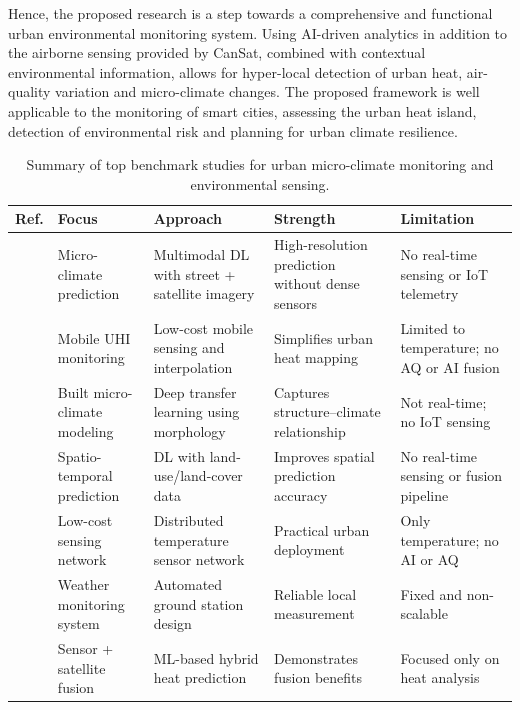 \documentclass[conference]{IEEEtran}
\begin{document}
Hence, the proposed research is a step towards a comprehensive and functional urban environmental monitoring system. Using AI-driven analytics in addition to the airborne sensing provided by CanSat, combined with contextual environmental information, allows for hyper-local detection of urban heat, air-quality variation and micro-climate changes. The proposed framework is well applicable to the monitoring of smart cities, assessing the urban heat island, detection of environmental risk and planning for urban climate resilience.

\begin{table}[!t]
\centering
\caption{Summary of top benchmark studies for urban micro-climate monitoring and environmental sensing.}
\label{tab:lit_short}
\renewcommand{\arraystretch}{1.15}
\setlength{\tabcolsep}{4pt}

\begin{tabularx}{\textwidth}{|c|p{3cm}|p{3.2cm}|p{3.5cm}|X|}
\hline
\textbf{Ref.} & \textbf{Focus} & \textbf{Approach} & \textbf{Strength} & \textbf{Limitation} \\
\hline

\cite{R1} & Micro-climate prediction & Multimodal DL with street + satellite imagery & High-resolution prediction without dense sensors & No real-time sensing or IoT telemetry \\

\cite{R3} & Mobile UHI monitoring & Low-cost mobile sensing and interpolation & Simplifies urban heat mapping & Limited to temperature; no AQ or AI fusion \\

\cite{R6} & Built micro-climate modeling & Deep transfer learning using morphology & Captures structure--climate relationship & Not real-time; no IoT sensing \\

\cite{R7} & Spatio-temporal prediction & DL with land-use/land-cover data & Improves spatial prediction accuracy & No real-time sensing or fusion pipeline \\

\cite{R8} & Low-cost sensing network & Distributed temperature sensor network & Practical urban deployment & Only temperature; no AI or AQ \\

\cite{R11} & Weather monitoring system & Automated ground station design & Reliable local measurement & Fixed and non-scalable \\

\cite{R14} & Sensor + satellite fusion & ML-based hybrid heat prediction & Demonstrates fusion benefits & Focused only on heat analysis \\


\end{tabularx}
\end{table}
\end{document}
